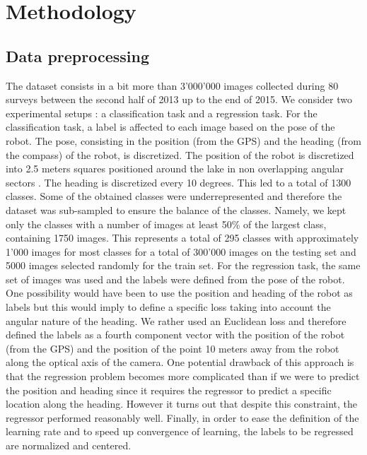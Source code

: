\section{Methodology}

%

%

\subsection{Data preprocessing}


The dataset consists in a bit more than 3'000'000 images collected during 80 surveys between the second half of 2013 up to the end of 2015. We consider two experimental setups : a classification task and a regression task. For the classification task, a label is affected to each image based on the pose of the robot. The pose, consisting in the position (from the GPS) and the heading (from the compass) of the robot, is discretized. The position of the robot is discretized into 2.5 meters squares positioned around the lake in non overlapping angular sectors . The heading is discretized every 10 degrees. This led to a total of 1300  classes. Some of the obtained classes were underrepresented and therefore the dataset was sub-sampled to ensure the balance of the classes. Namely, we kept only the classes with a number of images at least 50\% of the largest class, containing 1750 images. This represents a total of 295 classes with approximately 1'000 images for most classes for a total of 300'000 images on the testing set  and 5000 images selected randomly for the train set. For the regression task, the same set of images was used and the labels were defined from the pose of the robot. One possibility would have been to use the position and heading of the robot as labels but this would imply to define a specific loss taking into account the angular nature of the heading. We rather used an Euclidean loss and therefore defined the labels as a fourth component vector with the position of the robot (from the GPS) and the position of the point 10 meters away from the robot along the optical axis of the camera. One potential drawback of this approach is that the regression problem becomes more complicated than if we were to predict the position and heading since it requires the regressor to predict a specific location along the heading. However it turns out that despite this constraint, the regressor performed reasonably well. Finally, in order to ease the definition of the learning rate and to speed up convergence of learning, the labels to be regressed are normalized and centered.


